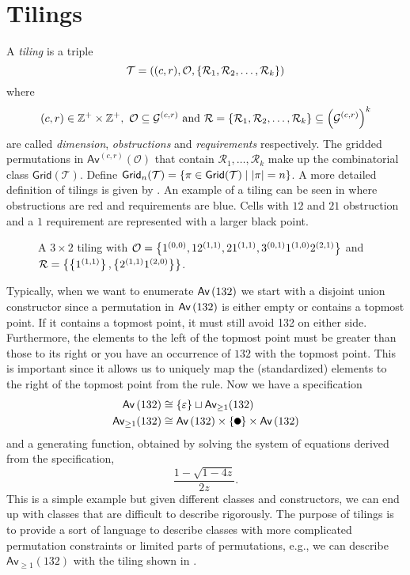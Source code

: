 \section{Tilings\label{sec:tilings}}
A \emph{tiling} is a triple
\[
\mathcal{T} = ((c,r), \mathcal{O}, \left\{\mathcal{R}_1,\mathcal{R}_2,\dotsc,\mathcal{R}_k\right\})
\]
where
\[
    (c,r) \in \mathbb{Z}^+ \times \mathbb{Z}^+, \ \mathcal{O} \subseteq \mathcal{G}^{(c,r)} \text{ and } \mathcal{R}=\left\{\mathcal{R}_1,\mathcal{R}_2,\dotsc,\mathcal{R}_k\right\} \subseteq \left(\mathcal{G}^{(c,r)}\right)^k
\]
are called \emph{dimension}, \emph{obstructions} and \emph{requirements} respectively. The gridded permutations in $\textsf{Av}^{(c,r)}\left(\mathcal{O}\right)$ that contain $\mathcal{R}_1,\dotsc,\mathcal{R}_k$ make up the combinatorial class $\textsf{Grid}(\mathcal{T})$. Define $\textsf{Grid}_n(\mathcal{T}) = \left\{\pi \in \textsf{Grid}(\mathcal{T}) \mid |\pi| = n\right\}$. A more detailed definition of tilings is given by . An example of a tiling can be seen in  where obstructions are red and requirements are blue. Cells with $12$ and $21$ obstruction and a $1$ requirement are represented with a larger black point.

\begin{figure}[htbp]
    \centering
    
    \caption{A $3 \times 2$ tiling with $\mathcal{O} = \left\{1^{(0,0)},12^{(1,1)},21^{(1,1)},3^{(0,1)}1^{(1,0)}2^{(2,1)}\right\}$ and $\mathcal{R} = \left\{\left\{1^{(1,1)}\right\},\left\{2^{(1,1)}1^{(2,0)}\right\}\right\}$.}
    \label{fig:tiling_example}
\end{figure}

Typically, when we want to enumerate $\textsf{Av}\left(132\right)$ we start with a disjoint union constructor since a permutation in $\textsf{Av}\left(132\right)$ is either empty or contains a topmost point. If it contains a topmost point, it must still avoid 132 on either side. Furthermore, the elements to the left of the topmost point must be greater than those to its right or you have an occurrence of $132$ with the topmost point. This is important since it allows us to uniquely map the (standardized) elements to the right of the topmost point from the rule. Now we have a specification
\begin{align*}
\Av{132} &\cong \set{\varepsilon} \sqcup \textsf{Av}_{\geq1}(132)\\
\textsf{Av}_{\geq1}(132) &\cong \Av{132} \times \set{\point{0.1}} \times \Av{132}
\end{align*}
and a generating function, obtained by solving the system of equations derived from the specification,
\[
\frac{1-\sqrt{1-4z}}{2z}.
\]
This is a simple example but given different classes and constructors, we can end up with classes that are difficult to describe rigorously. The purpose of tilings is to provide a sort of language to describe classes with more complicated permutation constraints or limited parts of permutations, e.g., we can describe $\textsf{Av}_{\geq1}(132)$ with the tiling shown in .

